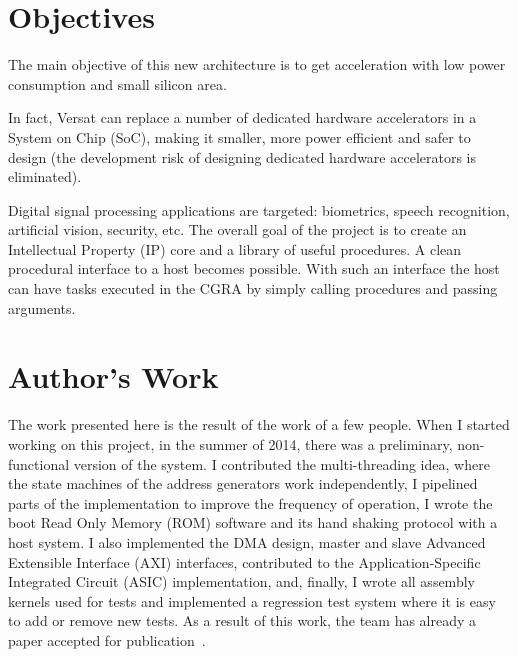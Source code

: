 

\section{Objectives}
\label{section:objectives}

The main objective of this new architecture is to get acceleration
with low power consumption and small silicon area.

In fact, Versat can replace a number of dedicated hardware
accelerators in a System on Chip (SoC), making it smaller, more power
efficient and safer to design (the development risk of designing
dedicated hardware accelerators is eliminated).

Digital signal processing applications are targeted: biometrics,
speech recognition, artificial vision, security, etc. The overall goal
of the project is to create an Intellectual Property (IP) core and a
library of useful procedures. A clean procedural interface to a host
becomes possible. With such an interface the host can have tasks
executed in the CGRA by simply calling procedures and passing
arguments.


\section{Author's Work}
\label{section:authorWork}

The work presented here is the result of the work of a few
people. When I started working on this project, in the summer of 2014,
there was a preliminary, non-functional version of the system.  I
contributed the multi-threading idea, where the state machines of the
address generators work independently, I pipelined parts of the
implementation to improve the frequency of operation, I wrote the boot
Read Only Memory (ROM) software and its hand shaking protocol with a
host system. I also implemented the DMA design, master and slave
Advanced Extensible Interface (AXI) interfaces, contributed to the
Application-Specific Integrated Circuit (ASIC) implementation, and,
finally, I wrote all assembly kernels used for tests and implemented a
regression test system where it is easy to add or remove new tests. As
a result of this work, the team has already a paper accepted for
publication~\cite{deSousa16}.

